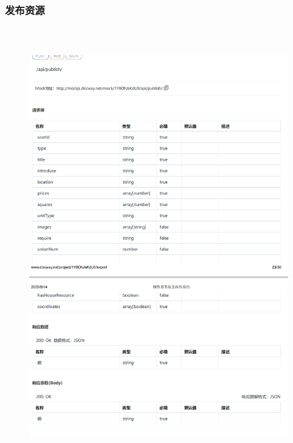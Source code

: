         \subsubsection{发布资源}  
        \begin{figure}[h]
            \centering
            \includegraphics[height=19.0cm,width=14.0cm]{design/image/api25.png} 
            \end{figure}  
            \newpage  
